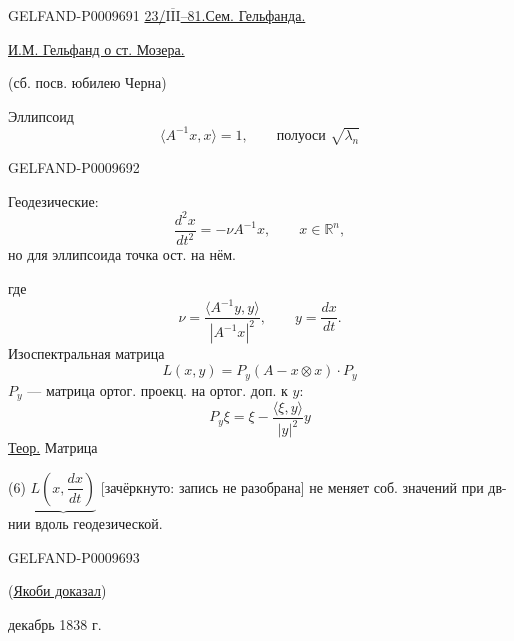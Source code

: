 \begin{GelfandAdjacentEvidence}{GELFAND-P000969}{1}
\underline{23/\underline{\(\overline{\mathrm{III}}\)}--81.}\quad\underline{Сем. Гельфанда.}

\underline{И.М. Гельфанд о ст. Мозера.}

(сб. посв. юбилею Черна)

Эллипсоид
\begin{equation*}
 \langle A^{-1}x,x\rangle=1,\qquad\text{полуоси }\sqrt{\lambda_n}\tag{1}
\end{equation*}
\end{GelfandAdjacentEvidence}
\begin{GelfandAdjacentEvidence}{GELFAND-P000969}{2}


Геодезические:
\begin{equation*}
 \frac{d^2x}{dt^2}=-\nu A^{-1}x,\qquad x\in\mathbb R^n,\tag{2}
\end{equation*}
но для эллипсоида точка ост. на нём.

где
\begin{equation*}
 \nu=\frac{\langle A^{-1}y,y\rangle}{|A^{-1}x|^2},\qquad
 y=\frac{dx}{dt}.\tag{3}
\end{equation*}
Изоспектральная матрица
\begin{equation*}
 L(x,y)=P_y(A-x\otimes x)\cdot P_y\tag{4}
\end{equation*}
$P_y$ --- матрица ортог. проекц. на ортог. доп. к $y$:
\begin{equation*}
 P_y\xi=\xi-\frac{\langle\xi,y\rangle}{|y|^2}y\tag{5}
\end{equation*}
\underline{Теор.} Матрица

(6) $\underbrace{L\left(x,\dfrac{dx}{dt}\right)}$
[зачёркнуто: запись не разобрана] не меняет соб. значений при дв-нии вдоль геодезической.

\end{GelfandAdjacentEvidence}
\begin{GelfandAdjacentEvidence}{GELFAND-P000969}{3}


(\underline{Якоби доказал})

декабрь 1838 г.
\end{GelfandAdjacentEvidence}
